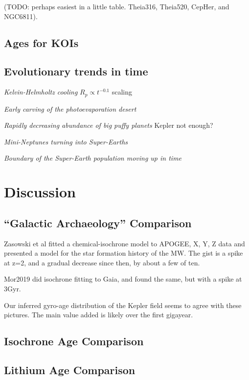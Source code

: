 \documentclass[11pt,twocolumn,tighten]{aastex63}
\begin{document}
(TODO: perhaps easiest in a little table.  Theia316, Theia520, CepHer,
and NGC6811).




\subsection{Ages for KOIs}

\subsection{Evolutionary trends in time}

{\it Kelvin-Helmholtz cooling}
$R_p \propto t^{-0.1}$ scaling \citep{Gupta_2019}

{\it Early carving of the photoevaporation desert}
\citep{Owen_Lai_2018}

{\it Rapidly decreasing abundance of big puffy planets}
Kepler not enough?

{\it Mini-Neptunes turning into Super-Earths}
\citep[e.g.][]{Rogers_2021}

{\it Boundary of the Super-Earth population moving up in time}
\citep{David_2021}


\section{Discussion}
\label{sec:disc}

\subsection{``Galactic Archaeology'' Comparison}
Zasowski et al fitted a chemical-isochrone model to APOGEE, X, Y, Z
data and presented a model for the star formation history of the MW.
The gist is a spike at z=2, and a gradual decrease since then, by
about a few of ten.

Mor2019 did isochrone fitting to Gaia, and found the same, but with a
spike at 3Gyr.

Our inferred gyro-age distribution of the Kepler field seems to agree
with these pictures.  The main value added is likely over the first
gigayear.

\subsection{Isochrone Age Comparison}

\subsection{Lithium Age Comparison}
\end{document}
